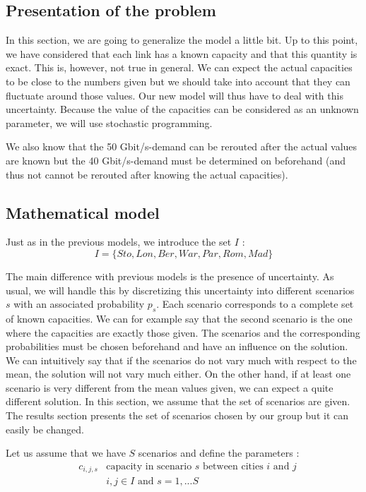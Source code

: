 \subsection{Presentation of the problem}
In this section, we are going to generalize the model a little bit. Up to this point, we have considered that each link has a known capacity and that this quantity is exact. This is, however, not true in general. We can expect the actual capacities to be close to the numbers given but we should take into account that they can fluctuate around those values. Our new model will thus have to deal with this uncertainty. Because the value of the capacities can be considered as an unknown parameter, we will use stochastic programming.

We also know that the 50 Gbit/s-demand can be rerouted after the actual values are known but the 40 Gbit/s-demand must be determined on beforehand (and thus not cannot be rerouted after knowing the actual capacities).

\subsection{Mathematical model}
Just as in the previous models, we introduce the set $I$ :
$$I = \{ Sto,Lon,Ber,War,Par,Rom,Mad\}$$

The main difference with previous models is the presence of uncertainty. As usual, we will handle this by discretizing this uncertainty into different scenarios $s$ with an associated probability $p_s$. Each scenario corresponds to a complete set of known capacities. We can for example say that the second scenario is the one where the capacities are exactly those given. The scenarios and the corresponding probabilities must be chosen beforehand and have an influence on the solution. We can intuitively say that if the scenarios do not vary much with respect to the mean, the solution will not vary much either. On the other hand, if at least one scenario is very different from the mean values given, we can expect a quite different solution. In this section, we assume that the set of scenarios are given. The results section presents the set of scenarios chosen by our group but it can easily be changed.

Let us assume that we have $S$ scenarios and define the parameters : 
\begin{align*}
&c_{i,j,s} &\text{capacity in scenario $s$ between cities $i$ and $j$} \\
& &i,j \in I \text{ and } s=1,...S
\end{align*}


